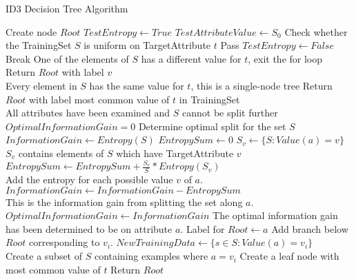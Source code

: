 \begin{algorithm}
  \caption{ID3 Decision Tree Algorithm}
  \begin{algorithmic}
    \State Create node $Root$
    \State $TestEntropy\gets True$
    \State $TestAttributeValue\gets S_0$
    \Comment Check whether the TrainingSet $S$ is uniform on TargetAttribute $t$
    \State Pass
    \Else
    \State $TestEntropy\gets False$
    \State Break
    \Comment One of the elements of $S$ has a different value for $t$, exit the for loop
    \EndIf
    \EndFor
    \State Return $Root$ with label $v$\\
    \Comment Every element in $S$ has the same value for $t$, this is a single-node tree
    \State Return $Root$ with label most common value of $t$ in TrainingSet\\
    \Comment All attributes have been examined and $S$ cannot be split further
    \Else
    \State $OptimalInformationGain=0$
    \Comment Determine optimal split for the set $S$
    \State $InformationGain \gets Entropy(S)$
    \State $EntropySum\gets 0$
    \State $S_v \gets \{S:Value(a)=v\}$
    \Comment $S_v$ contains elements of $S$ which have TargetAttribute $v$
    \State $EntropySum\gets EntropySum + \frac{S_v}{S} * Entropy(S_v)$\\
    \Comment Add the entropy for each possible value $v$ of $a$.
    \EndFor
    \State $InformationGain \gets InformationGain - EntropySum$\\
    \Comment This is the information gain from splitting the set along $a$.
    \State $OptimalInformationGain \gets InformationGain$
    \EndIf
    \EndFor
    \Comment The optimal information gain has been determined to be on attribute $a$.
    \State Label for $Root\gets a$
    \State Add branch below $Root$ corresponding to $v_i$.
    \State $NewTrainingData\gets \{s\in S:Value(a)=v_i\}$\\
    \Comment Create a subset of $S$ containing examples where $a=v_i$
    \State Create a leaf node with most common value of $t$
    \EndIf
    \EndFor
    \EndIf
    \State Return $Root$
    \EndProcedure
  \end{algorithmic}
\end{algorithm}

